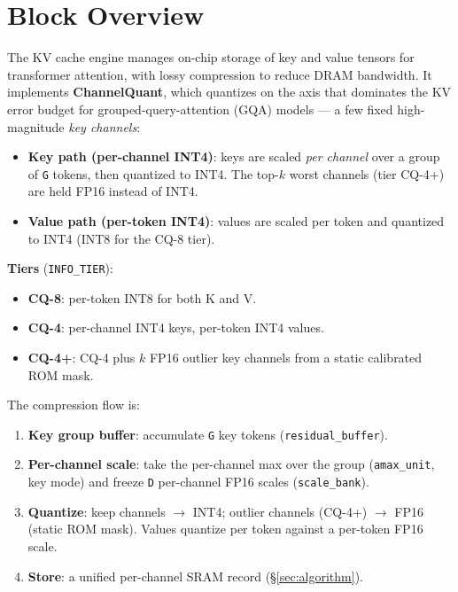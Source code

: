 \documentclass[11pt]{article}
\begin{document}
\clearpage

\tableofcontents
\clearpage

\section{Block Overview}
\label{sec:overview}

The KV cache engine manages on-chip storage of key and value tensors for
transformer attention, with lossy compression to reduce DRAM bandwidth. It
implements \textbf{ChannelQuant}, which quantizes on the axis that dominates the
KV error budget for grouped-query-attention (GQA) models --- a few fixed
high-magnitude \emph{key channels}:

\begin{itemize}
\item \textbf{Key path (per-channel INT4)}: keys are scaled \emph{per channel}
      over a group of \texttt{G} tokens, then quantized to INT4. The top-$k$
      worst channels (tier CQ-4+) are held FP16 instead of INT4.
\item \textbf{Value path (per-token INT4)}: values are scaled per token and
      quantized to INT4 (INT8 for the CQ-8 tier).
\end{itemize}

\noindent\textbf{Tiers} (\texttt{INFO\_TIER}):
\begin{itemize}
\item \textbf{CQ-8}: per-token INT8 for both K and V.
\item \textbf{CQ-4}: per-channel INT4 keys, per-token INT4 values.
\item \textbf{CQ-4+}: CQ-4 plus $k$ FP16 outlier key channels from a static
      calibrated ROM mask.
\end{itemize}

\noindent The compression flow is:
\begin{enumerate}
\item \textbf{Key group buffer}: accumulate \texttt{G} key tokens
      (\texttt{residual\_buffer}).
\item \textbf{Per-channel scale}: take the per-channel max over the group
      (\texttt{amax\_unit}, key mode) and freeze \texttt{D} per-channel FP16
      scales (\texttt{scale\_bank}).
\item \textbf{Quantize}: keep channels $\to$ INT4; outlier channels (CQ-4+) $\to$
      FP16 (static ROM mask). Values quantize per token against a per-token FP16
      scale.
\item \textbf{Store}: a unified per-channel SRAM record (\S\ref{sec:algorithm}).
\end{enumerate}
\end{document}
